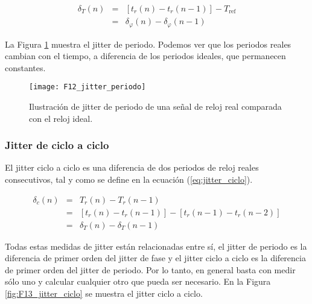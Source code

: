                 \begin{eqnarray}
                    \delta_{T}(n) & = & [t_{r} (n) - t_{r} (n-1)] - T_{\text{ref}}\\
                                  & = & \delta_{\varphi}(n) - \delta_{\varphi}(n-1)
                    \label{eq:jitter_periodo}
                \end{eqnarray}

                La Figura \ref{fig:F12_jitter_periodo} muestra el jitter de periodo. Podemos ver que los periodos reales cambian con el tiempo, a diferencia de los periodos ideales, que permanecen constantes.

                \begin{figure}[hbtp]
                    \centering
                    \texttt{[image: F12\_jitter\_periodo]}
                    \caption{Ilustración de jitter de periodo de una señal de reloj real comparada con el reloj ideal.}
                    \label{fig:F12_jitter_periodo}
                \end{figure}

            \subsubsection{Jitter de ciclo a ciclo}

                El jitter ciclo a ciclo es una diferencia de dos periodos de reloj reales consecutivos, tal y como se define en la ecuación (\ref{eq:jitter_ciclo}).
                
                \begin{eqnarray}
                    \delta_{c}(n) & = & T_{r} (n) - T_{r} (n-1)\\
                                  & = & [t_{r}(n) - t_{r}(n-1)] - [t_{r}(n-1) - t_{r}(n-2)] \\
                                  & = & \delta_{T}(n) - \delta_{T}(n-1)
                    \label{eq:jitter_ciclo}
                \end{eqnarray}

                Todas estas medidas de jitter están relacionadas entre sí, el jitter de periodo es la diferencia de primer orden del jitter de fase y el jitter ciclo a ciclo es la diferencia de primer orden del jitter de periodo. Por lo tanto, en general basta con medir sólo uno y calcular cualquier otro que pueda ser necesario. En la Figura \ref{fig:F13_jitter_ciclo} se muestra el jitter ciclo a ciclo.

